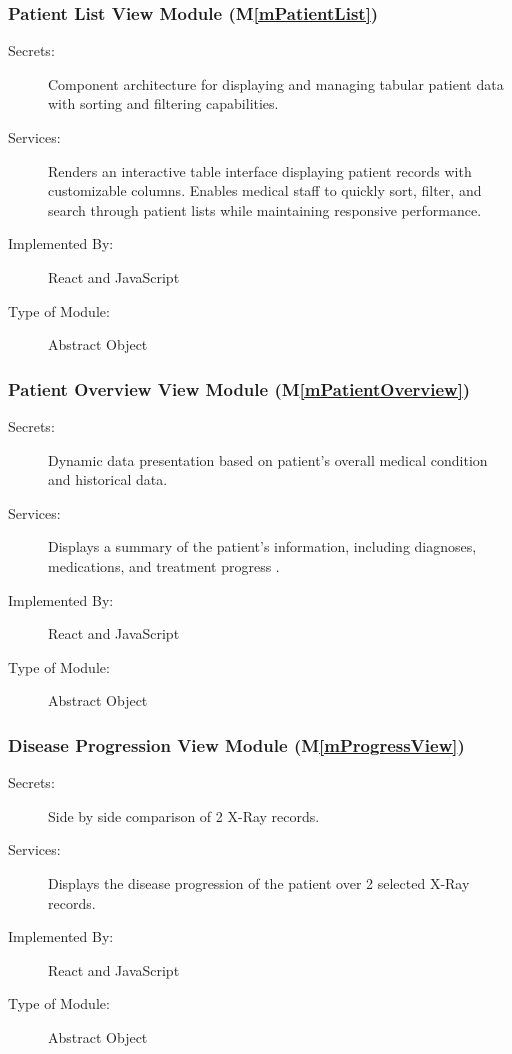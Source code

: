\documentclass[12pt, titlepage]{article}
\newcommand{\mref}[1]{M\ref{#1}}
\begin{document}
\subsubsection{Patient List View Module (\mref{mPatientList})}
\begin{description}
\item[Secrets:] Component architecture for displaying and managing tabular patient data with sorting and filtering capabilities.
\item[Services:] Renders an interactive table interface displaying patient records with customizable columns. Enables medical staff to quickly sort, filter, and search through patient lists while maintaining responsive performance.
\item[Implemented By:] React and JavaScript
\item[Type of Module:] Abstract Object
\end{description}

\subsubsection{Patient Overview View Module (\mref{mPatientOverview})}
\begin{description}
\item[Secrets:] Dynamic data presentation based on patient's overall medical condition and historical data.
\item[Services:] Displays a summary of the patient's information, including diagnoses, medications, and treatment progress .
\item[Implemented By:] React and JavaScript
\item[Type of Module:] Abstract Object
\end{description}

\subsubsection{Disease Progression View Module (\mref{mProgressView})}
\begin{description}
\item[Secrets:] Side by side comparison of 2 X-Ray records.
\item[Services:] Displays the disease progression of the patient over 2 selected X-Ray records.
\item[Implemented By:] React and JavaScript
\item[Type of Module:] Abstract Object
\end{description}
\end{document}
